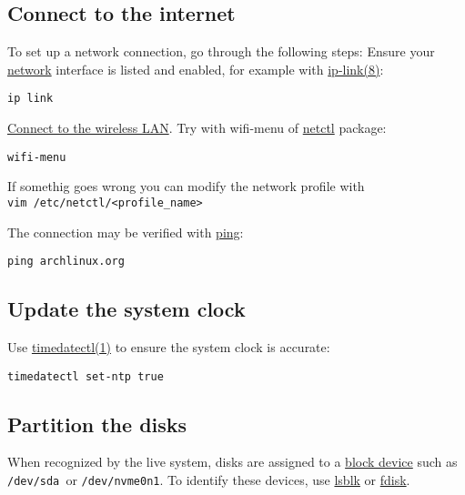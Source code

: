 \documentclass[12pt,A4]{article}
\begin{document}
\subsection{Connect to the internet}
To set up a network connection, go through the following steps:
\newline
Ensure your \href{https://wiki.archlinux.org/index.php/Network_interface}{network} interface is listed and enabled, for example with \href{https://jlk.fjfi.cvut.cz/arch/manpages/man/ip-link.8}{ip-link(8)}:
\begin{verbatim}
ip link
\end{verbatim}
\href{https://wiki.archlinux.org/index.php/Wireless_network_configurationc}{Connect to the wireless LAN}.
Try with wifi-menu of \href{https://wiki.archlinux.org/index.php/Netctl}{netctl} package:
\begin{verbatim}
wifi-menu
\end{verbatim}
\begin{tcolorbox}[colback=ArchGreen,sharp corners,boxrule=0.2mm]
If somethig goes wrong you can modify the network profile with \\ \texttt{vim /etc/netctl/<profile\_name>}
\end{tcolorbox}
The connection may be verified with \href{https://en.wikipedia.org/wiki/ping}{ping}:
\begin{verbatim}
ping archlinux.org
\end{verbatim}

\subsection{Update the system clock}
Use \href{https://jlk.fjfi.cvut.cz/arch/manpages/man/timedatectl.1}{timedatectl(1)} to ensure the system clock is accurate:

\begin{verbatim}
timedatectl set-ntp true
\end{verbatim}

\subsection{Partition the disks}
When recognized by the live system, disks are assigned to a \href{https://wiki.archlinux.org/index.php/Device_file#Block_devices}{block device} such as \texttt{/dev/sda }or \texttt{/dev/nvme0n1}. To identify these devices, use \href{https://wiki.archlinux.org/index.php/Lsblk}{lsblk} or \href{https://wiki.archlinux.org/index.php/Fdisk}{fdisk}.
\end{document}
